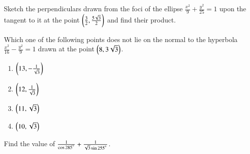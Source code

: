 \documentclass[journal,12pt,twocolumn]{IEEEtran}
\begin{document}
%
%
%
%
\begin{problem}
Sketch the perpendiculars drawn from
the foci of the ellipse
$\frac{x^2}{9}+\frac{y^2}{25}=1$
upon the tangent
to it at the point $\left(\frac{3}{2},\frac{5\sqrt{3}}{2}\right)$ and find their product.
\end{problem}
%
%
\begin{problem}
Which one of the following points
does not lie on the normal
to the hyperbola $\frac{x^2}{16}-\frac{y^2}{9}=1$ drawn at the point $\left(8, 3\sqrt{3}\right)$.
\begin{enumerate}
\item $\left(13, -\frac{1}{\sqrt{3}}\right)$
\item $\left(12, \frac{1}{\sqrt{3}}\right)$
\item $\left(11, \sqrt{3}\right)$
\item $\left(10, \sqrt{3}\right)$	
\end{enumerate}
\end{problem}
%
\begin{problem}
Find the value of $\frac{1}{\cos 285^{\degree}}+ \frac{1}{\sqrt{3}\sin 255^{\degree}}$.
\end{problem}
%
%
%
%
\end{document}
